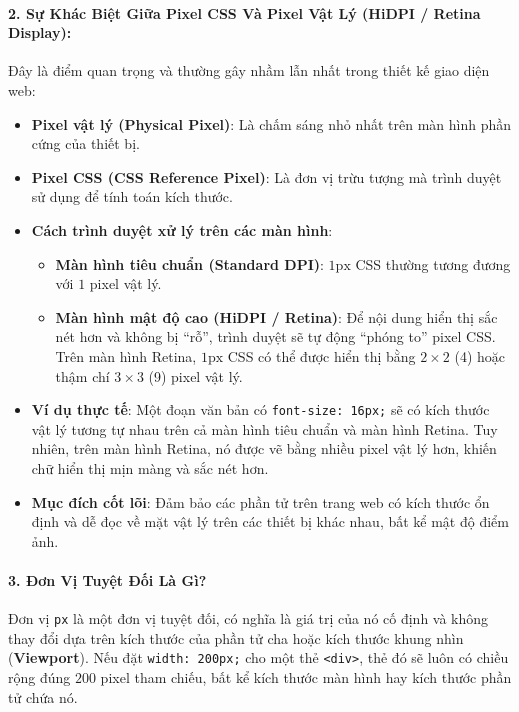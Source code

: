\documentclass[11pt,oneside]{book}
\newcommand{\codeinline}[1]{\textcolor{accentOrange}{\texttt{#1}}}
\newcommand{\term}[1]{\textbf{\textcolor{primaryBlue}{#1}}}
\begin{document}
\paragraph{2. Sự Khác Biệt Giữa Pixel CSS Và Pixel Vật Lý (HiDPI / Retina Display):}
Đây là điểm quan trọng và thường gây nhầm lẫn nhất trong thiết kế giao diện web:
\begin{itemize}[leftmargin=1.5em, itemsep=3pt, parsep=0pt]
    \item \textbf{Pixel vật lý (Physical Pixel)}: Là chấm sáng nhỏ nhất trên màn hình phần cứng của thiết bị.
    \item \textbf{Pixel CSS (CSS Reference Pixel)}: Là đơn vị trừu tượng mà trình duyệt sử dụng để tính toán kích thước.
    \item \textbf{Cách trình duyệt xử lý trên các màn hình}:
    \begin{itemize}[leftmargin=1.2em, itemsep=2pt, parsep=0pt]
        \item \textbf{Màn hình tiêu chuẩn (Standard DPI)}: $1\text{px}$ CSS thường tương đương với $1$ pixel vật lý.
        \item \textbf{Màn hình mật độ cao (HiDPI / Retina)}: Để nội dung hiển thị sắc nét hơn và không bị ``rỗ'', trình duyệt sẽ tự động ``phóng to'' pixel CSS. Trên màn hình Retina, $1\text{px}$ CSS có thể được hiển thị bằng $2 \times 2$ (4) hoặc thậm chí $3 \times 3$ (9) pixel vật lý.
    \end{itemize}
    \item \textbf{Ví dụ thực tế}: Một đoạn văn bản có \codeinline{font-size: 16px;} sẽ có kích thước vật lý tương tự nhau trên cả màn hình tiêu chuẩn và màn hình Retina. Tuy nhiên, trên màn hình Retina, nó được vẽ bằng nhiều pixel vật lý hơn, khiến chữ hiển thị mịn màng và sắc nét hơn.
    \item \textbf{Mục đích cốt lõi}: Đảm bảo các phần tử trên trang web có kích thước ổn định và dễ đọc về mặt vật lý trên các thiết bị khác nhau, bất kể mật độ điểm ảnh.
\end{itemize}

\paragraph{3. Đơn Vị Tuyệt Đối Là Gì?}
Đơn vị \codeinline{px} là một đơn vị tuyệt đối, có nghĩa là giá trị của nó cố định và không thay đổi dựa trên kích thước của phần tử cha hoặc kích thước khung nhìn (\term{Viewport}). Nếu đặt \codeinline{width: 200px;} cho một thẻ \codeinline{<div>}, thẻ đó sẽ luôn có chiều rộng đúng $200$ pixel tham chiếu, bất kể kích thước màn hình hay kích thước phần tử chứa nó.
\end{document}
